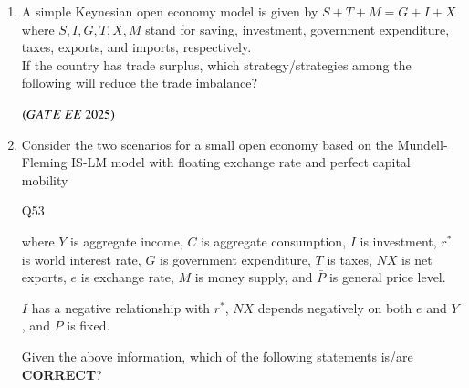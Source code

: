 \documentclass[journal,12pt,onecolumn]{IEEEtran}
\theoremstyle{remark}
\begin{document}
\begin{enumerate}
\item A simple Keynesian open economy model is given by
$
S + T + M = G + I + X
$
where $S, I, G, T, X, M$ stand for saving, investment, government expenditure, taxes, exports, and imports, respectively. \\
If the country has trade surplus, which strategy/strategies among the following will reduce the trade imbalance?
\begin{enumerate}
\end{enumerate}
\hfill $\left(GATE\ EE\ 2025\right)$

\item Consider the two scenarios for a small open economy based on the Mundell-Fleming IS-LM model with floating exchange rate and perfect capital mobility

\begin{table}
\centering
\caption{Q53}
\label{Q53}

\end{table}
where $Y$ is aggregate income, $C$ is aggregate consumption, $I$ is investment, $r^*$ is world interest rate, $G$ is government expenditure, $T$ is taxes, $NX$ is net exports, $e$ is exchange rate, $M$ is money supply, and $\bar{P}$ is general price level.  

$I$ has a negative relationship with $r^*$, $NX$ depends negatively on both $e$ and $Y$, and $\bar{P}$ is fixed.  

Given the above information, which of the following statements is/are \textbf{CORRECT}?


\end{enumerate}
\end{document}
